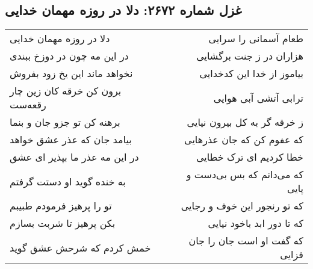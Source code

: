 \begin{center}
\section*{غزل شماره ۲۶۷۲: دلا در روزه مهمان خدایی}
\label{sec:2672}
\begin{longtable}{l p{0.5cm} r}
دلا در روزه مهمان خدایی
&&
طعام آسمانی را سرایی
\\
در این مه چون در دوزخ ببندی
&&
هزاران در ز جنت برگشایی
\\
نخواهد ماند این یخ زود بفروش
&&
بیاموز از خدا این کدخدایی
\\
برون کن خرقه کان زین چار رقعه‌ست
&&
ترابی آتشی آبی هوایی
\\
برهنه کن تو جزو جان و بنما
&&
ز خرقه گر به کل بیرون نیایی
\\
بیامد جان که عذر عشق خواهد
&&
که عفوم کن که جان عذرهایی
\\
در این مه عذر ما بپذیر ای عشق
&&
خطا کردیم ای ترک خطایی
\\
به خنده گوید او دستت گرفتم
&&
که می‌دانم که بس بی‌دست و پایی
\\
تو را پرهیز فرمودم طبیبم
&&
که تو رنجور این خوف و رجایی
\\
بکن پرهیز تا شربت بسازم
&&
که تا دور ابد باخود نیایی
\\
خمش کردم که شرحش عشق گوید
&&
که گفت او است جان را جان فزایی
\\
\end{longtable}
\end{center}
